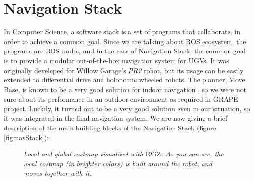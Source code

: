 


\section{Navigation Stack}\label{sec:navigationStack}

In Computer Science, a software stack is a set of programs that collaborate, in order to achieve a common goal. Since we are talking about \ac{ROS} ecosystem, the programs are \ac{ROS} nodes, and in the case of Navigation Stack, the common goal is to provide a modular out-of-the-box navigation system for \ac{UGV}s. It was originally developed for Willow Garage's \textit{PR2} robot, but its usage can be easily extended to differential drive and holonomic wheeled robots. The planner, Move Base, is known to be a very good solution for indoor navigation \parencite{moveBaseIndoor}, so we were not sure about its performance in an outdoor environment as required in \ac{GRAPE} project. Luckily, it turned out to be a very good solution even in our situation, so it was integrated in the final navigation system. We are now giving a brief description of the main building blocks of the Navigation Stack (figure \ref{fig:navStack}):

\begin{figure}
	\centering
	\qquad
	\caption{\textit{Local and global costmap visualized with} RViZ\textit{. As you can see, the local costmap (in brighter colors) is built around the robot, and moves together with it.}}
	\label{fig:localGlobalCostmap}
\end{figure}



